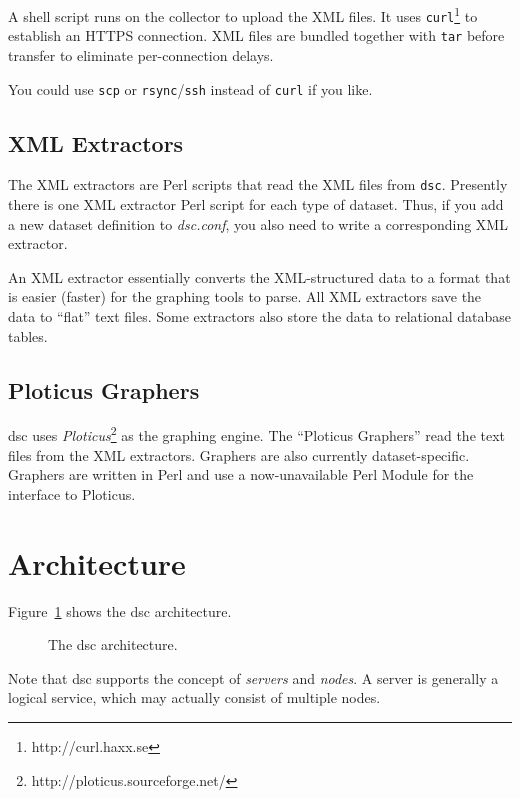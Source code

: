 \documentclass{report}
\def\dsc{{\sc dsc}}
\begin{document}
A shell script runs on the collector to upload the XML files.  It
uses {\tt curl\/}\footnote{http://curl.haxx.se} to establish an
HTTPS connection.  XML files are bundled together with {\tt tar\/}
before transfer to eliminate per-connection delays.

You could use {\tt scp\/} or {\tt rsync\/}/{\tt ssh\/} instead of
{\tt curl\/} if you like.

\subsection{XML Extractors}

The XML extractors are Perl scripts that read the XML files from
{\tt dsc\/}.  Presently there is one XML extractor Perl script for
each type of dataset.  Thus, if you add a new dataset definition
to {\em dsc.conf\/}, you also need to write a corresponding XML
extractor.

An XML extractor essentially converts the XML-structured data to a
format that is easier (faster) for the graphing tools to parse.
All XML extractors save the data to ``flat'' text files.  Some
extractors also store the data to relational database tables.

\subsection{Ploticus Graphers}

{\dsc} uses {\em Ploticus\/}\footnote{http://ploticus.sourceforge.net/}
as the graphing engine.  The ``Ploticus Graphers'' read the text
files from the XML extractors.  Graphers are also currently
dataset-specific.   Graphers are written in Perl and use a
now-unavailable Perl Module for the interface to Ploticus.


\section{Architecture}

Figure~\ref{fig-architecture} shows the {\dsc} architecture.  

\begin{figure}
\centerline{}
\label{fig-architecture}
\caption{The {\dsc} architecture.}
\end{figure}

Note that {\dsc} supports the concept of {\em servers\/} and {\em
nodes\/}.  A server is generally a logical service, which may
actually consist of multiple nodes.
\end{document}
